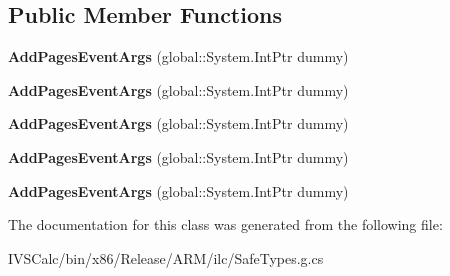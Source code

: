 \subsection*{Public Member Functions}
\begin{DoxyCompactItemize}
\item 
\mbox{\label{class_windows_1_1_u_i_1_1_xaml_1_1_printing_1_1_add_pages_event_args_af72b35ed13100a2accf8146ca223de47}} 
{\bfseries Add\+Pages\+Event\+Args} (global\+::\+System.\+Int\+Ptr dummy)
\item 
\mbox{\label{class_windows_1_1_u_i_1_1_xaml_1_1_printing_1_1_add_pages_event_args_af72b35ed13100a2accf8146ca223de47}} 
{\bfseries Add\+Pages\+Event\+Args} (global\+::\+System.\+Int\+Ptr dummy)
\item 
\mbox{\label{class_windows_1_1_u_i_1_1_xaml_1_1_printing_1_1_add_pages_event_args_af72b35ed13100a2accf8146ca223de47}} 
{\bfseries Add\+Pages\+Event\+Args} (global\+::\+System.\+Int\+Ptr dummy)
\item 
\mbox{\label{class_windows_1_1_u_i_1_1_xaml_1_1_printing_1_1_add_pages_event_args_af72b35ed13100a2accf8146ca223de47}} 
{\bfseries Add\+Pages\+Event\+Args} (global\+::\+System.\+Int\+Ptr dummy)
\item 
\mbox{\label{class_windows_1_1_u_i_1_1_xaml_1_1_printing_1_1_add_pages_event_args_af72b35ed13100a2accf8146ca223de47}} 
{\bfseries Add\+Pages\+Event\+Args} (global\+::\+System.\+Int\+Ptr dummy)
\end{DoxyCompactItemize}


The documentation for this class was generated from the following file\+:\begin{DoxyCompactItemize}
\item 
I\+V\+S\+Calc/bin/x86/\+Release/\+A\+R\+M/ilc/Safe\+Types.\+g.\+cs\end{DoxyCompactItemize}
